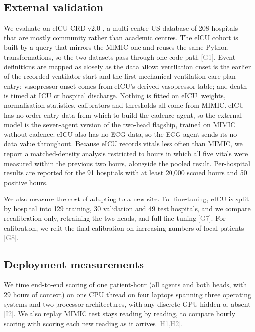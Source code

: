 \documentclass[11pt]{article}
\newcommand{\ev}[1]{\textcolor{gray}{\scriptsize[#1]}}   %
\begin{document}
\subsection{External validation}
We evaluate on eICU-CRD v2.0 \cite{pollard2018eicu}, a multi-centre US
database of 208 hospitals that are mostly community rather than academic
centres. The eICU cohort is built by a query that mirrors the MIMIC one and
reuses the same Python transformations, so the two datasets pass through one
code path \ev{G1}. Event definitions are mapped as closely as the data allow:
ventilation onset is the earlier of the recorded ventilator start and the
first mechanical-ventilation care-plan entry; vasopressor onset comes from
eICU's derived vasopressor table; and death is timed at ICU or hospital
discharge. Nothing is fitted on eICU: weights, normalisation statistics,
calibrators and thresholds all come from MIMIC. eICU has no order-entry data
from which to build the cadence agent, so the external model is the
seven-agent version of the two-head flagship, trained on MIMIC without
cadence. eICU also has no ECG data, so the ECG agent sends its no-data value
throughout. Because eICU records vitals less often than MIMIC, we report a
matched-density analysis restricted to hours in which all five vitals were
measured within the previous two hours, alongside the pooled result.
Per-hospital results are reported for the 91 hospitals with at least 20{,}000
scored hours and 50 positive hours.

We also measure the cost of adapting to a new site. For fine-tuning, eICU is
split by hospital into 129 training, 30 validation and 49 test hospitals, and
we compare recalibration only, retraining the two heads, and full fine-tuning
\ev{G7}. For calibration, we refit the final calibration on increasing numbers
of local patients \ev{G8}.

\subsection{Deployment measurements}
We time end-to-end scoring of one patient-hour (all agents and both heads,
with 29 hours of context) on one CPU thread on four laptops spanning three
operating systems and two processor architectures, with any discrete GPU
hidden or absent \ev{I2}. We also replay MIMIC test stays reading by reading,
to compare hourly scoring with scoring each new reading as it arrives
\ev{H1,H2}.

\end{document}
